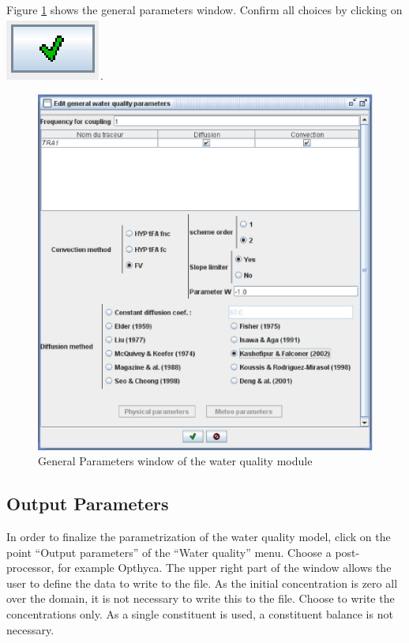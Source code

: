 \documentclass[a4paper,12pt]{article}
\begin{document}
\vspace{0.5cm}

Figure \ref{fig:General-Param_wq} shows the general parameters
window. Confirm all choices by clicking on \includegraphics[scale=0.6]{valid}.

\begin{figure}[h]
  \begin{center}
  \includegraphics[scale=0.5]{general_paramsT}
  \caption{General Parameters window of the water quality module}
  \label{fig:General-Param_wq}
  \end{center}
\end{figure}



\subsection{Output Parameters}

\hspace{0.5cm}In order to finalize the parametrization of the water quality model,
click on the point {}``Output parameters'' of the {}``Water quality''
menu. Choose a post-processor, for example Opthyca. The upper right
part of the window allows the user to define the data to write
to the file. As the initial concentration is zero all over the domain,
it is not necessary to write this to the file. Choose to write the
concentrations only. As a single constituent is used, a constituent
balance is not necessary.
\end{document}
